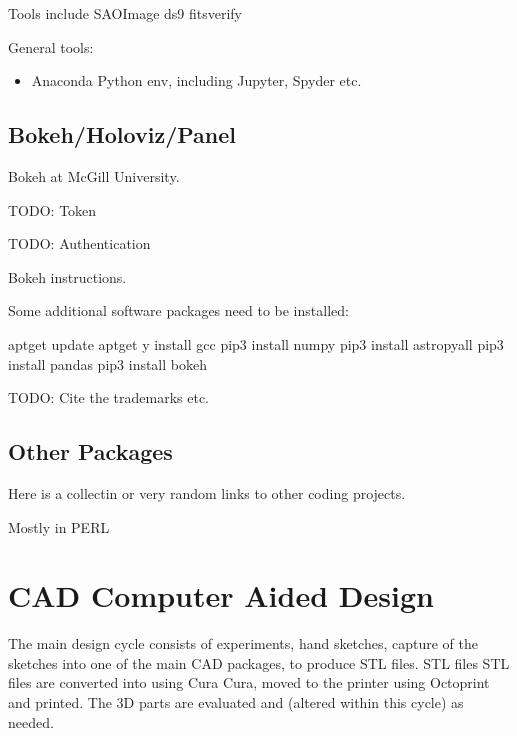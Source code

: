 \documentclass[letterpaper,10pt,english,openany,oneside]{sphinxmanual}
\begin{document}
\sphinxAtStartPar
Tools include
\sphinxhyphen{} SAOImage ds9
\sphinxhyphen{} fitsverify

\sphinxAtStartPar
General tools:
\begin{itemize}
\item {} 
\sphinxAtStartPar
Anaconda Python env, including Jupyter, Spyder etc.

\end{itemize}


\section{Bokeh/Holoviz/Panel}
\label{\detokenize{software:bokeh-holoviz-panel}}
\sphinxAtStartPar
Bokeh  at McGill University.

\sphinxAtStartPar
TODO: Token

\sphinxAtStartPar
TODO: Authentication

\sphinxAtStartPar
Bokeh 
instructions.

\sphinxAtStartPar
Some additional software packages need to be installed:

\begin{sphinxVerbatim}[commandchars=\\\{\},numbers=left,firstnumber=1,stepnumber=1]
apt\PYGZhy{}get update
apt\PYGZhy{}get \PYGZhy{}y install gcc
pip3 install numpy
pip3 install astropy\PYG{o}{[}all\PYG{o}{]}
pip3 install pandas
pip3 install bokeh
\end{sphinxVerbatim}

\sphinxAtStartPar
TODO: Cite the trademarks etc.


\section{Other Packages}
\label{\detokenize{software:other-packages}}
\sphinxAtStartPar
Here is a collectin or very random links to other coding projects.

\sphinxAtStartPar
Mostly in PERL


\chapter{CAD Computer Aided Design}
\label{\detokenize{cad:cad-computer-aided-design}}\label{\detokenize{cad::doc}}
\sphinxAtStartPar
The main design cycle consists of experiments, hand sketches, capture
of the sketches into one of the main CAD packages, to produce STL
files. STL files STL files are converted into  using Cura Cura, moved to
the printer using  Octoprint and printed. The 3D parts are
evaluated and (altered within this cycle) as needed.
\end{document}
